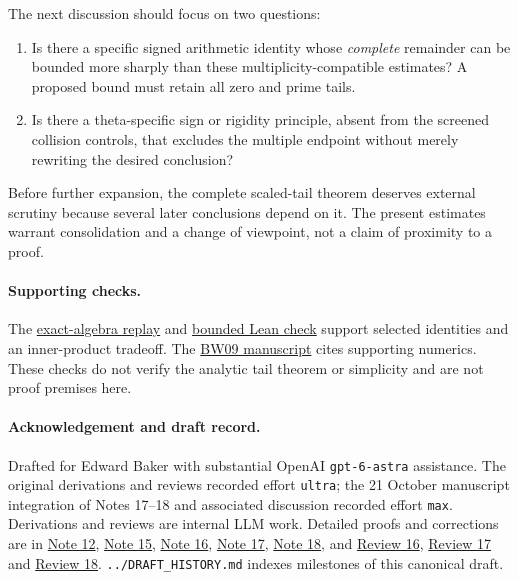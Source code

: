 \documentclass[11pt]{article}
\newcommand{\Nref}{\href{../notes/16_GEVREY_GLOBAL_APPROXIMATION_AND_RATE_20261020.md}{Note 16}}
\newcommand{\Href}{\href{../notes/15_COMPLETED_RATIO_ENERGY_AND_MULTIPLICITY_20261020.md}{Note 15}}
\newcommand{\CNref}{\href{../notes/17_NORMALIZED_HEAT_GLOBAL_LIMIT_AND_ARITHMETIC_COSTS_20261020.md}{Note 17}}
\newcommand{\CTref}{\href{../notes/18_ARITHMETIC_HEAT_TRANSFER_AND_EXACT_COMPLETION_20261021.md}{Note 18}}
\begin{document}
The next discussion should focus on two questions:
\begin{enumerate}
\item Is there a specific signed arithmetic identity whose \emph{complete}
remainder can be bounded more sharply than these multiplicity-compatible
estimates? A proposed bound must retain all zero and prime tails.
\item Is there a theta-specific sign or rigidity principle, absent from
the screened collision controls, that excludes the multiple endpoint
without merely rewriting the desired conclusion?
\end{enumerate}
Before further expansion, the complete scaled-tail theorem deserves
external scrutiny because several later conclusions depend on it.
The present estimates warrant consolidation and a change of viewpoint,
not a claim of proximity to a proof.

\paragraph{Supporting checks.}
The \href{../numerics/EXACT_ALGEBRA_REPLAY_20261020.json}{exact-algebra replay}
and \href{../numerics/lean/README.md}{bounded Lean check}
support selected identities and an inner-product tradeoff.
The \href{../../09_expanding_contour_later_collision/manuscript/main.tex}{BW09 manuscript}
cites supporting numerics. These checks do not verify the analytic tail
theorem or simplicity and are not proof premises here.

\paragraph{Acknowledgement and draft record.}
Drafted for Edward Baker with substantial OpenAI \texttt{gpt-6-astra}
assistance. The original derivations and reviews recorded effort
\texttt{ultra}; the 21 October manuscript integration of Notes 17--18
and associated discussion recorded effort \texttt{max}.
Derivations and reviews are
internal LLM work. Detailed proofs and corrections are in
\href{../notes/12_FINITE_EVALUATION_AND_ENDPOINT_INVERSE_COSTS_20261020.md}{Note 12},
\Href, \Nref, \CNref, \CTref, and
\href{../reviews/16_GEVREY_GLOBAL_APPROXIMATION_REVIEW_20261020.md}{Review 16},
\href{../reviews/17_NORMALIZED_HEAT_LIMIT_AND_ARITHMETIC_REVIEW_20261020.md}{Review 17}
and \href{../reviews/18_ARITHMETIC_HEAT_TRANSFER_AND_COMPLETION_REVIEW_20261021.md}{Review 18}.
\texttt{../DRAFT\_HISTORY.md} indexes milestones of this canonical draft.
\end{document}
